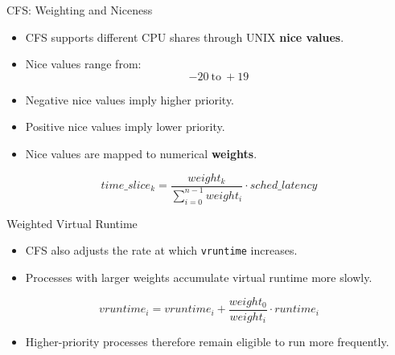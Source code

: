 
\begin{frame}{CFS: Weighting and Niceness}
    \begin{itemize}
        \item CFS supports different CPU shares through UNIX \textbf{nice values}.
        \item Nice values range from:
        \[
            -20 \ \text{to}\ +19
        \]

        \item Negative nice values imply higher priority.
        \item Positive nice values imply lower priority.
        \item Nice values are mapped to numerical \textbf{weights}.
    \end{itemize}

    \[
        time\_slice_k =
        \frac{weight_k}
        {\sum_{i=0}^{n-1} weight_i}
        \cdot sched\_latency
    \]
\end{frame}


\begin{frame}{Weighted Virtual Runtime}
    \begin{itemize}
        \item CFS also adjusts the rate at which \texttt{vruntime} increases.
        \item Processes with larger weights accumulate virtual runtime more slowly.
    \end{itemize}

    \[
        vruntime_i =
        vruntime_i +
        \frac{weight_0}{weight_i}
        \cdot runtime_i
    \]

    \begin{itemize}
        \item Higher-priority processes therefore remain eligible to run
        more frequently.
    \end{itemize}
\end{frame}


